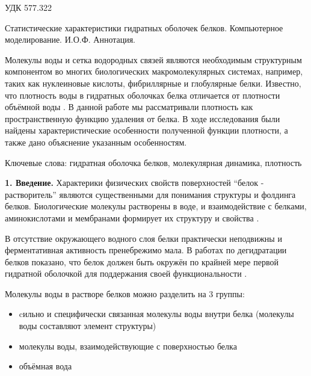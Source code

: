 \documentclass[a4paper]{article}
\begin{document}

\begin{flushleft}
УДК 577.322
\end{flushleft}

\begin{center}
Статистические характеристики гидратных оболочек белков. Компьютерное моделирование.
\newline
И.О.Ф.
\newline
\newline
Аннотация.
\end{center}

Молекулы воды и сетка водородных связей являются необходимым структурным компонентом во многих биологических макромолекулярных системах, например, таких как нуклеиновые кислоты, фибриллярные и глобулярные белки. Известно, что плотность воды в гидратных оболочках белка отличается от плотности объёмной воды \cite{Svergun} . В данной работе мы рассматривали плотность как пространственную функцию удаления от белка. В ходе исследования были найдены характеристические особенности полученной функции плотности, а также дано объяснение указанным особенностям.
  
Ключевые слова: гидратная оболочка белков, молекулярная динамика, плотность 

\textbf{1. Введение.} Характерики физических свойств поверхностей “белок - растворитель” являются существенными для понимания структуры и фолдинга белков. Биологические молекулы растворены в воде, и взаимодействие с белками, аминокислотами и мембранами формирует их структуру и свойства \cite{Kauzman}.

В отсутствие окружающего водного слоя белки практически неподвижны и ферментативная активность пренебрежимо мала. В работах по дегидратации белков показано, что белок должен быть окружён по крайней мере первой гидратной оболочкой для поддержания своей функциональности \cite{Mattos}.

Молекулы воды в растворе белков можно разделить на 3 группы: 
\begin{itemize}
\item cильно и специфически связанная молекулы воды внутри белка (молекулы воды составляют элемент структуры)
\item молекулы воды, взаимодействующие с поверхностью белка
\item объёмная вода
\end{itemize}
\end{document}
